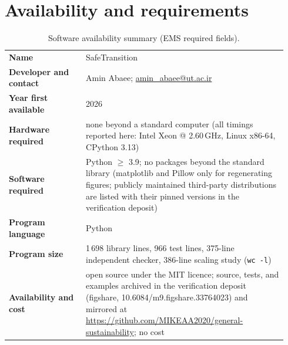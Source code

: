 \documentclass[3p,11pt]{elsarticle}
\begin{document}
\section{Availability and requirements}\label{sec:availability}

\begin{table}[h]
\centering
\small
\begin{tabular}{@{}p{0.26\linewidth}p{0.68\linewidth}@{}}
\toprule
\textbf{Name} & SafeTransition \\
\textbf{Developer and contact} & Amin Abaee;
\href{mailto:amin_abaee@ut.ac.ir}{amin\_abaee@ut.ac.ir} \\
\textbf{Year first available} & 2026 \\
\textbf{Hardware required} & none beyond a standard computer (all timings
reported here: Intel Xeon @ 2.60\,GHz, Linux x86-64, CPython 3.13) \\
\textbf{Software required} & Python $\geq$ 3.9; no packages beyond the
standard library (matplotlib and Pillow only for regenerating figures;
publicly maintained third-party distributions are listed with their pinned
versions in the verification deposit) \\
\textbf{Program language} & Python \\
\textbf{Program size} & 1\,698 library lines, 966 test lines, 375-line
independent checker, 386-line scaling study (\texttt{wc~-l}) \\
\textbf{Availability and cost} & open source under the MIT licence; source,
tests, and examples archived in the verification deposit
\citep{Deposit2026} (figshare, 10.6084/m9.figshare.33764023) and mirrored
at \url{https://github.com/MIKEAA2020/general-sustainability}; no cost \\
\bottomrule
\end{tabular}
\caption{Software availability summary (EMS required fields).}
\label{tab:availability}
\end{table}
\end{document}
